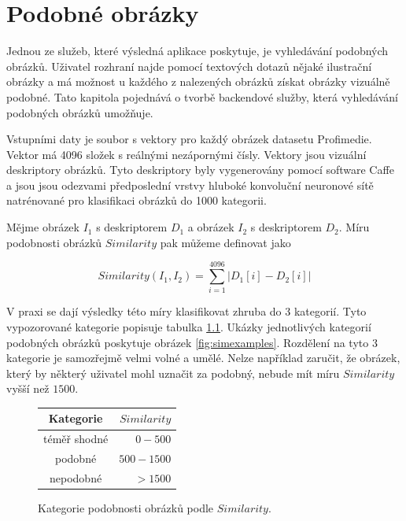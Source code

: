 \chapter{Podobné obrázky}


Jednou ze služeb, které výsledná aplikace poskytuje, je vyhledávání podobných obrázků. Uživatel rozhraní najde pomocí textových dotazů nějaké ilustrační obrázky a má možnost u každého z nalezených obrázků získat obrázky vizuálně podobné. Tato kapitola pojednává o tvorbě backendové služby, která vyhledávání podobných obrázků umožňuje.

Vstupními daty je soubor s vektory pro každý obrázek datasetu Profimedie. Vektor má 4096 složek s reálnými nezápornými čísly. Vektory jsou vizuální deskriptory obrázků. Tyto deskriptory byly vygenerovány pomocí software Caffe a jsou jsou odezvami předposlední vrstvy hluboké konvoluční neuronové sítě natrénované pro klasifikaci obrázků do 1000 kategorii.

Mějme obrázek $I_1$ s deskriptorem $D_1$ a obrázek $I_2$ s deskriptorem $D_2$. Míru podobnosti obrázků $Similarity$ pak můžeme definovat jako

\begin{equation}
  Similarity(I_1, I_2) = \sum_{i=1}^{4096} |D_1[i]-D_2[i]|
\end{equation}

V praxi se dají výsledky této míry klasifikovat zhruba do 3 kategorií. Tyto vypozorované kategorie popisuje tabulka \ref{fig:simtypes}. Ukázky jednotlivých kategorií podobných obrázků poskytuje obrázek \ref{fig:simexamples}. Rozdělení na tyto 3 kategorie je samozřejmě velmi volné a umělé. Nelze například zaručit, že obrázek, který by některý uživatel mohl uznačit za podobný, nebude mít míru $Similarity$ vyšší než $1500$.

\begin{figure}[h]
\label{fig:simtypes}
\centering
\begin{tabular}{ | c | r |}
  \hline
     Kategorie & $Similarity$\\
  \hline
  \hline
    téměř shodné & $0 - 500$ \\
  \hline
    podobné & $500 - 1500$ \\
  \hline
    nepodobné & $> 1500$ \\
\hline
\end{tabular}

  \caption{Kategorie podobnosti obrázků podle $Similarity$.}
\end{figure}

